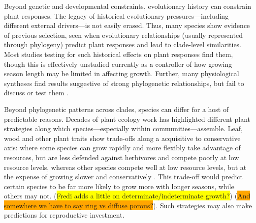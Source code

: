 \documentclass[11pt]{article}
\begin{document}
Beyond genetic and developmental constraints, evolutionary history can constrain plant responses. The legacy of historical evolutionary pressures---including different external drivers---is not easily erased.  Thus, many species show evidence of previous selection, seen when evolutionary relationships (usually represented through phylogeny) predict plant responses and lead to clade-level similarities. Most studies testing for such historical effects on plant responses find them, though this is effectively unstudied currently as a controller of how growing season length may be limited in affecting growth. Further, many physiological syntheses find results suggestive of strong phylogenetic relationships, but fail to discuss or test them \citep[e.g., discussions of evergreen versus deciduous phenology without testing for whether this is actually correlated with the deep in time split between gymnosperms and angiosperms,][]{way2010differential}. 

Beyond phylogenetic patterns across clades, species can differ for a host of predictable reasons. Decades of plant ecology work has highlighted different plant strategies along which species---especially within communities---assemble. Leaf, wood and other plant traits show trade-offs along a acquisitive to conservative axis: where some species can grow rapidly and more flexibly take advantage of resources, but are less defended against herbivores and compete poorly at low resource levels, whereas other species compete well at low resource levels, but at the expense of growing slower and conservatively \citep[][]{Grime:1977sw,diaz2016}. This trade-off would predict certain species to be far more likely to grow more with longer seasons, while others may not. (\colorbox{yellow}{Fredi adds a little on determinate/indeterminate growth?}) (\colorbox{orange}{And somewhere we have to say ring vs diffuse porous?}). Such strategies may also make predictions for reproductive investment. %
\end{document}
